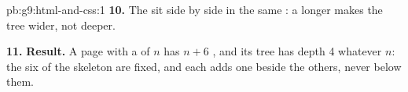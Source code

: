 \begin{solution}{pb:g9:html-and-css:1}
\textbf{10.} The  sit side by side in the same : a longer 
makes the tree wider, not deeper.

\textbf{11.} \textbf{Result.} A page with a  of $n$  has $n + 6$
, and its tree has depth 4 whatever $n$: the six  of the
skeleton are fixed, and each  adds one  beside the others, never
below them.
\end{solution}
